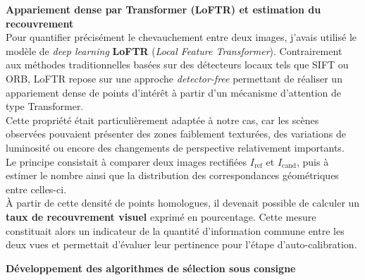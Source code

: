 \documentclass[12pt,a4paper,oneside]{report}
\begin{document}
\par\bigskip
\par\bigskip

\hspace*{0.4cm}\textbf{Appariement dense par Transformer (LoFTR) et estimation du recouvrement}\\

\hspace*{.3cm}Pour quantifier précisément le chevauchement entre deux images, j'avais utilisé le modèle de \textit{deep learning} \textbf{LoFTR} (\textit{Local Feature Transformer}). Contrairement aux méthodes traditionnelles basées sur des détecteurs locaux tels que SIFT ou ORB, LoFTR repose sur une approche \textit{detector-free} permettant de réaliser un appariement dense de points d'intérêt à partir d'un mécanisme d'attention de type Transformer.\\
\hspace*{.3cm}Cette propriété était particulièrement adaptée à notre cas, car les scènes observées pouvaient présenter des zones faiblement texturées, des variations de luminosité ou encore des changements de perspective relativement importants.\\

\hspace*{.3cm}Le principe consistait à comparer deux images rectifiées $I_{\text{ref}}$ et $I_{\text{cand}}$, puis à estimer le nombre ainsi que la distribution des correspondances géométriques entre celles-ci.\\

\hspace*{.3cm}À partir de cette densité de points homologues, il devenait possible de calculer un \textbf{taux de recouvrement visuel} exprimé en pourcentage. Cette mesure constituait alors un indicateur de la quantité d'information commune entre les deux vues et permettait d'évaluer leur pertinence pour l'étape d'auto-calibration.\\

\par\bigskip
\par\bigskip

\hspace*{0.4cm}\textbf{Développement des algorithmes de sélection sous consigne}\\
\end{document}
